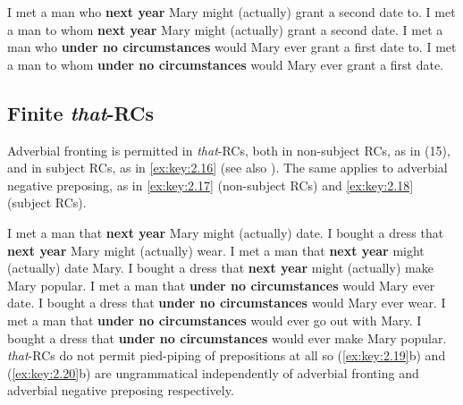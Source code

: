 \documentclass[output=paper]{langsci/langscibook}
\begin{document}
\ea\label{ex:key:2.13}
    \ea    I met a man who \textbf{next year} Mary might (actually) grant a second date to.
    \ex    I met a man to whom \textbf{next year} Mary might (actually) grant a second date.
    \z
\z
\ea\label{ex:key:2.14}
    \ea    I met a man who \textbf{under no circumstances} would Mary ever grant a first date   to.
    \ex    I met a man to whom \textbf{under no circumstances} would Mary ever grant a first   date.
    \z
\z
\subsection{Finite \emph{that}-RCs}

Adverbial fronting is permitted in \emph{that}{-RCs, both in non-subject RCs,
as in (}15), and in subject RCs, as in \eqref{ex:key:2.16} (see also
\citealt{Doherty1993,Doherty2000}). The
same applies to adverbial negative preposing, as in \eqref{ex:key:2.17} (non-subject RCs) and
\eqref{ex:key:2.18} (subject RCs).

\ea\label{ex:key:2.15}
    \ea    I met a man that \textbf{next year} Mary might (actually) date.
    \ex    I bought a dress that \textbf{next year} Mary might (actually) wear.
    \z
\z
\ea\label{ex:key:2.16}
    \ea    I met a man that \textbf{next year} might (actually) date Mary.
    \ex    I bought a dress that \textbf{next year} might (actually) make Mary popular.
    \z
\z
\ea\label{ex:key:2.17}
    \ea    I met a man that \textbf{under no circumstances} would Mary ever date.
    \ex    I bought a dress that \textbf{under no circumstances} would Mary ever wear.
    \z
\z
\ea\label{ex:key:2.18}
    \ea    I met a man that \textbf{under no circumstances} would ever go out with Mary.
    \ex    I bought a dress that \textbf{under no circumstances} would ever make Mary popular.
    \z
\z
\emph{that}-\glspl{RC} do not permit pied-piping of prepositions at all so (\ref{ex:key:2.19}b) and
(\ref{ex:key:2.20}b) are ungrammatical independently of adverbial fronting and adverbial
negative preposing respectively.

\ea\label{ex:key:2.19}
    \z
\z
\ea\label{ex:key:2.20}
    \z
\z
\end{document}
